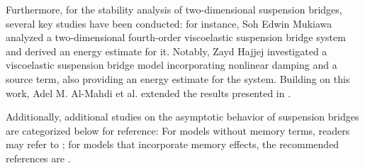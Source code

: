 \documentclass[11pt,reqno]{article}
\begin{document}
Furthermore, for the stability analysis of two-dimensional suspension bridges, several key studies have been conducted: for instance, Soh Edwin Mukiawa \cite{MR3754568} analyzed a two-dimensional fourth-order viscoelastic suspension bridge system and derived an energy estimate for it. Notably, Zayd Hajjej \cite{MR4252268} investigated a viscoelastic suspension bridge model incorporating nonlinear damping and a source term, also providing an energy estimate for the system. Building on this work, Adel M. Al-Mahdi et al. \cite{MR4694563} extended the results presented in \cite{MR4252268}.

Additionally, additional studies on the asymptotic behavior of suspension bridges are categorized below for reference: For models without memory terms, readers may refer to \cite{MR4875485, MR3023261, MR2142424, MR2514725}; for models that incorporate memory effects, the recommended references are \cite{MR4886591, MR3575770, MR3240285, MR3458828, MR3609015}.
\end{document}
